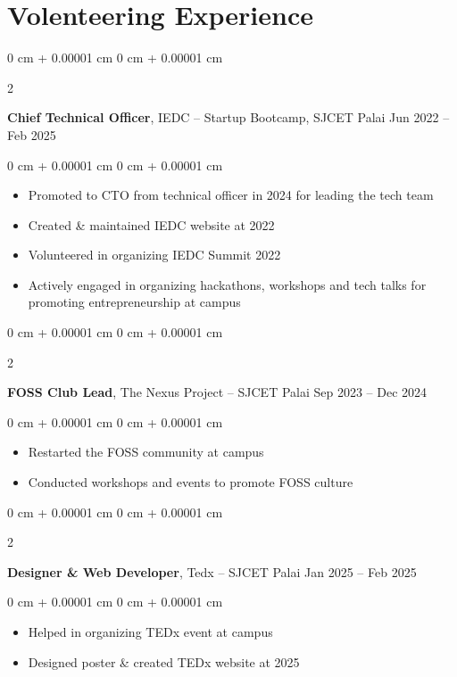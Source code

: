 \documentclass[10pt, letterpaper]{article}
\newenvironment{highlights}{
    \begin{itemize}[
        topsep=0.10 cm,
        parsep=0.10 cm,
        partopsep=0pt,
        itemsep=0pt,
        leftmargin=0 cm + 10pt
    ]
}{
    \end{itemize}
} %
\newenvironment{onecolentry}{
    \begin{adjustwidth}{
        0 cm + 0.00001 cm
    }{
        0 cm + 0.00001 cm
    }
}{
    \end{adjustwidth}
} %
\newenvironment{twocolentry}[2][]{
    \onecolentry
    \def\secondColumn{#2}
    \setcolumnwidth{\fill, 4.5 cm}
    \begin{paracol}{2}
}{
    \switchcolumn \raggedleft \secondColumn
    \end{paracol}
    \endonecolentry
} %
\begin{document}
\section{Volenteering Experience}

\begin{twocolentry}{
		Jun 2022 – Feb 2025
	}
	\textbf{Chief Technical Officer}, IEDC -- Startup Bootcamp, SJCET Palai\end{twocolentry}

\vspace{0.10 cm}
\begin{onecolentry}
	\begin{highlights}
		\item Promoted to CTO from technical officer in 2024 for leading the tech team
		\item Created \& maintained IEDC website at 2022
		\item Volunteered in organizing IEDC Summit 2022
		\item Actively engaged in organizing hackathons, workshops and tech talks for
		promoting entrepreneurship at campus
	\end{highlights}
\end{onecolentry}

\vspace{0.2 cm}

\begin{twocolentry}{
		Sep 2023 – Dec 2024
	}
	\textbf{FOSS Club Lead}, The Nexus Project -- SJCET Palai\end{twocolentry}

\vspace{0.10 cm}
\begin{onecolentry}
	\begin{highlights}
		\item Restarted the FOSS community at campus
		\item Conducted workshops and events to promote FOSS culture
	\end{highlights}
\end{onecolentry}

\vspace{0.2 cm}

\begin{twocolentry}{
		Jan 2025 – Feb 2025
	}
	\textbf{Designer \& Web Developer}, Tedx -- SJCET Palai\end{twocolentry}

\vspace{0.10 cm}
\begin{onecolentry}
	\begin{highlights}
		\item Helped in organizing TEDx event at campus
		\item Designed poster \& created TEDx website at 2025
	\end{highlights}
\end{onecolentry}
\end{document}
